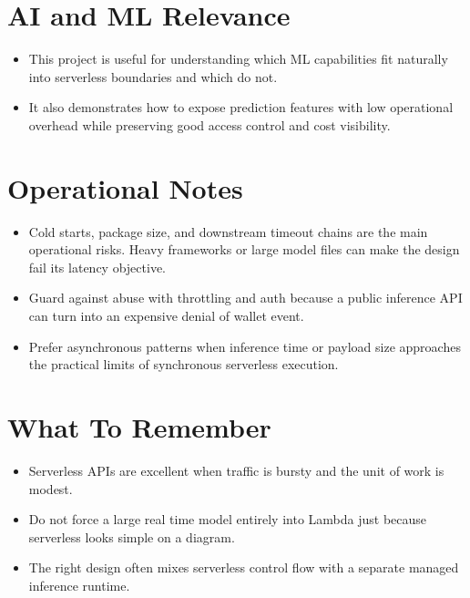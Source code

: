 \documentclass[10pt,twocolumn]{article}
\begin{document}
\section*{AI and ML Relevance}
\begin{itemize}
\item This project is useful for understanding which ML capabilities fit naturally into serverless boundaries and which do not.
\item It also demonstrates how to expose prediction features with low operational overhead while preserving good access control and cost visibility.
\end{itemize}

\section*{Operational Notes}
\begin{itemize}
\item Cold starts, package size, and downstream timeout chains are the main operational risks. Heavy frameworks or large model files can make the design fail its latency objective.
\item Guard against abuse with throttling and auth because a public inference API can turn into an expensive denial of wallet event.
\item Prefer asynchronous patterns when inference time or payload size approaches the practical limits of synchronous serverless execution.
\end{itemize}

\section*{What To Remember}
\begin{itemize}
\item Serverless APIs are excellent when traffic is bursty and the unit of work is modest.
\item Do not force a large real time model entirely into Lambda just because serverless looks simple on a diagram.
\item The right design often mixes serverless control flow with a separate managed inference runtime.
\end{itemize}
\end{document}
